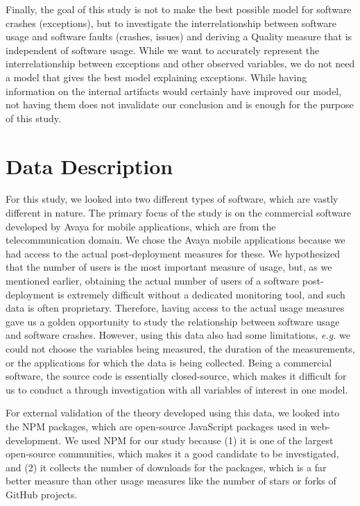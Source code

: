 \documentclass[smallcondensed]{svjour3}     %
\begin{document}
Finally, the goal of this study is not to make the best possible model for software crashes (exceptions), but to investigate the interrelationship between software usage and software faults (crashes, issues) and deriving a Quality measure that is independent of software usage. While we want to accurately represent the interrelationship between exceptions and other observed variables, we do not need a model that gives the best model explaining exceptions. While having information on the internal artifacts would certainly have improved our model, not having them does not invalidate our conclusion and is enough for the purpose of this study.

\vspace{-10pt}
\section{Data Description}\label{s:data}

For this study, we looked into two different types of software, which are vastly different in nature. The primary focus of the study is on the commercial software developed by Avaya for mobile applications, which are from the telecommunication domain.  We chose the Avaya mobile applications because we had access to the actual post-deployment measures for these. We hypothesized that the number of users is the most important measure of usage, but, as we mentioned earlier, obtaining the actual number of users of a software post-deployment is extremely difficult without a dedicated monitoring tool, and such data is often proprietary. 
Therefore, having access to the actual usage measures gave us a golden opportunity to study the relationship between software usage and software crashes. However, using this data also had some limitations, \emph{e.g.} we could not choose the variables being measured, the duration of the measurements, or the applications for which the data is being collected. Being a commercial software, the source code is essentially closed-source, which makes it difficult for us to conduct a through investigation with all variables of interest in one model.

For external validation of the theory developed using this data, we looked into the NPM packages, which are open-source JavaScript packages used in web-development. We used NPM for our study because (1) it is one of the largest open-source communities, which makes it a good candidate to be investigated, and (2) it collects the number of downloads for the packages, which is a far better measure than other usage measures like the number of stars or forks of GitHub projects. 
\end{document}
